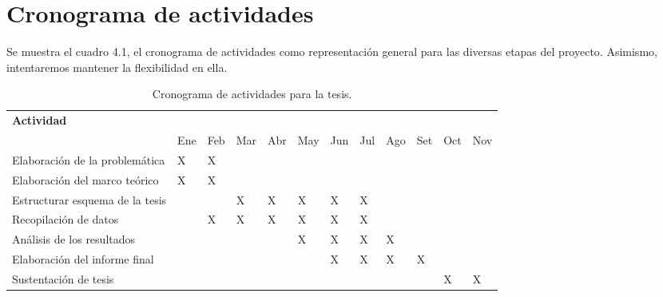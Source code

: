 \chapter{Cronograma de actividades}
Se muestra el cuadro 4.1, el cronograma de actividades como representación 
general para las diversas etapas del proyecto. Asimismo, intentaremos 
mantener la flexibilidad en ella. 
\begin{table}[h!]
    \centering
    \begin{tabularx}{\textwidth}{|l|*{11}{>{\centering\arraybackslash}X|}}
        \hline
        \textbf{Actividad} & \multicolumn{11}{c|}{\textbf{2025}} \\ \cline{2-12} 
        &Ene& Feb & Mar & Abr & May & Jun & Jul & Ago & Set & Oct & Nov \\ \hline
        Elaboración de la problemática & X & X & & & & & & & & & \\ \hline
        Elaboración del marco teórico & X & X & & & & & & & & & \\ \hline
        Estructurar esquema de la tesis & & & X & X & X & X & X & & & & \\ \hline
        Recopilación de datos & & X & X & X & X & X & X & & & & \\ \hline
        Análisis de los resultados & & & & & X & X & X & X & & & \\ \hline
        Elaboración del informe final & & & & & & X & X & X & X & & \\ \hline
        Sustentación de tesis & & & & & & & & & & X & X \\ \hline
    \end{tabularx}
    \caption{Cronograma de actividades para la tesis.}
\end{table}